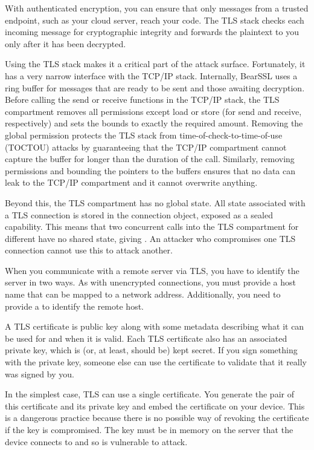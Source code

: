 {With authenticated encryption, you can ensure that only messages from a trusted endpoint, such as your cloud server, reach your code.
The TLS stack checks each incoming message for cryptographic integrity and forwards the plaintext to you only after it has been decrypted.

Using the TLS stack makes it a critical part of the attack surface.
Fortunately, it has a very narrow interface with the TCP/IP stack.
Internally, BearSSL uses a ring buffer for messages that are ready to be sent and those awaiting decryption.
Before calling the send or receive functions in the TCP/IP stack, the TLS compartment removes all permissions except load or store (for send and receive, respectively) and sets the bounds to exactly the required amount.
Removing the global permission protects the TLS stack from time-of-check-to-time-of-use (TOCTOU) attacks by guaranteeing that the TCP/IP compartment cannot capture the buffer for longer than the duration of the call.
Similarly, removing permissions and bounding the pointers to the buffers ensures that no data can leak to the TCP/IP compartment and it cannot overwrite anything.

Beyond this, the TLS compartment has no global state.
All state associated with a TLS connection is stored in the connection object, exposed as a sealed capability.
This means that two concurrent calls into the TLS compartment for different have no shared state, giving .
An attacker who compromises one TLS connection cannot use this to attack another.

When you communicate with a remote server via TLS, you have to identify the server in two ways.
As with unencrypted connections, you must provide a host name that can be mapped to a network address.
Additionally, you need to provide a  to identify the remote host.

A TLS certificate is public key along with some metadata describing what it can be used for and when it is valid.
Each TLS certificate also has an associated private key, which is (or, at least, should be) kept secret.
If you sign something with the private key, someone else can use the certificate to validate that it really was signed by you.

In the simplest case, TLS can use a single certificate.
You generate the pair of this certificate and its private key and embed the certificate on your device.
This is a dangerous practice because there is no possible way of revoking the certificate if the key is compromised.
The key must be in memory on the server that the device connects to and so is vulnerable to attack.

}
